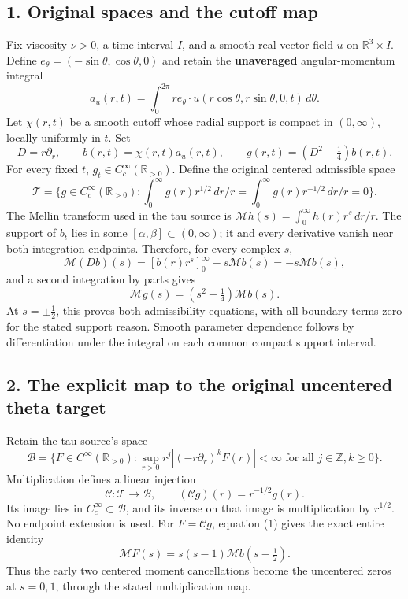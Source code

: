 \documentclass[10pt,a4paper,oneside]{report}
\begin{document}
\subsection{1. Original spaces and the cutoff
map}\label{proof09:original-spaces-and-the-cutoff-map}

Fix viscosity \(\nu>0\), a time interval \(I\), and a smooth real vector
field \(u\) on \(\mathbb R^3\times I\). Define
\(e_\theta=(-\sin\theta,\cos\theta,0)\) and retain the
\textbf{unaveraged} angular-momentum integral \[
a_u(r,t)=\int_0^{2\pi}r e_\theta\cdot u(r\cos\theta,r\sin\theta,0,t)\,d\theta.
\] Let \(\chi(r,t)\) be a smooth cutoff whose radial support is compact
in \((0,\infty)\), locally uniformly in \(t\). Set \[
D=r\partial_r,\qquad b(r,t)=\chi(r,t)a_u(r,t),\qquad
g(r,t)=(D^2-\tfrac14)b(r,t).
\] For every fixed \(t\), \(g_t\in C_c^\infty(\mathbb R_{>0})\). Define
the original centered admissible space \[
\mathscr T=\{g\in C_c^\infty(\mathbb R_{>0}):\int_0^\infty g(r)r^{1/2}\,dr/r=\int_0^\infty g(r)r^{-1/2}\,dr/r=0\}.
\] The Mellin transform used in the tau source is
\(\mathcal M h(s)=\int_0^\infty h(r)r^s\,dr/r\). The support of \(b_t\)
lies in some \([\alpha,\beta]\subset(0,\infty)\); it and every
derivative vanish near both integration endpoints. Therefore, for every
complex \(s\), \[
\mathcal M(Db)(s)=[b(r)r^s]_0^\infty-s\mathcal Mb(s)=-s\mathcal Mb(s),
\] and a second integration by parts gives \[
\mathcal Mg(s)=(s^2-\tfrac14)\mathcal Mb(s).
\tag{1}
\] At \(s=\pm\tfrac12\), this proves both admissibility equations, with
all boundary terms zero for the stated support reason. Smooth parameter
dependence follows by differentiation under the integral on each common
compact support interval.

\subsection{2. The explicit map to the original uncentered theta
target}\label{proof09:the-explicit-map-to-the-original-uncentered-theta-target}

Retain the tau source's space \[
\mathscr B=\{F\in C^\infty(\mathbb R_{>0}):\sup_{r>0}r^j|(-r\partial_r)^kF(r)|<\infty\text{ for all }j\in\mathbb Z,k\ge0\}.
\] Multiplication defines a linear injection \[
\mathcal C:\mathscr T\longrightarrow\mathscr B,\qquad (\mathcal Cg)(r)=r^{-1/2}g(r).
\tag{2}
\] Its image lies in \(C_c^\infty\subset\mathscr B\), and its inverse on
that image is multiplication by \(r^{1/2}\). No endpoint extension is
used. For \(F=\mathcal Cg\), equation (1) gives the exact entire
identity \[
\boxed{\mathcal MF(s)=s(s-1)\mathcal Mb(s-\tfrac12).}
\tag{3}
\] Thus the early two centered moment cancellations become the
uncentered zeros at \(s=0,1\), through the stated multiplication map.
\end{document}
